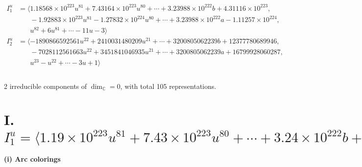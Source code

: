 \documentclass[1p]{elsarticle_modified}
\theoremstyle{definition}
\begin{document}
\begin{align*}
I^u_{1}&=\langle 
1.18568\times10^{223} u^{81}+7.43164\times10^{223} u^{80}+\cdots+3.23988\times10^{222} b+4.31116\times10^{223},\\
\phantom{I^u_{1}}&\phantom{= \langle  }-1.92883\times10^{223} u^{81}-1.27832\times10^{224} u^{80}+\cdots+3.23988\times10^{222} a-1.11257\times10^{224},\\
\phantom{I^u_{1}}&\phantom{= \langle  }u^{82}+6 u^{81}+\cdots-11 u-3\rangle \\
I^u_{2}&=\langle 
-1890866592561 u^{22}+2410031480209 u^{21}+\cdots+3200805062239 b+12377780689946,\\
\phantom{I^u_{2}}&\phantom{= \langle  }-7028112561663 u^{22}+3451841046935 u^{21}+\cdots+3200805062239 a+16799928060287,\\
\phantom{I^u_{2}}&\phantom{= \langle  }u^{23}- u^{22}+\cdots-3 u+1\rangle \\
\\
\end{align*}
\raggedright * 2 irreducible components of $\dim_{\mathbb{C}}=0$, with total 105 representations.\\
\newpage
\renewcommand{\arraystretch}{1}
\centering \section*{I. $I^u_{1}= \langle 1.19\times10^{223} u^{81}+7.43\times10^{223} u^{80}+\cdots+3.24\times10^{222} b+4.31\times10^{223},\;-1.93\times10^{223} u^{81}-1.28\times10^{224} u^{80}+\cdots+3.24\times10^{222} a-1.11\times10^{224},\;u^{82}+6 u^{81}+\cdots-11 u-3 \rangle$}
\flushleft \textbf{(i) Arc colorings}\\
\end{document}
